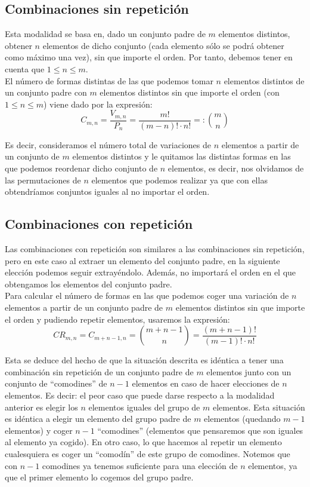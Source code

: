 \subsection{Combinaciones sin repetición}
Esta modalidad se basa en, dado un conjunto padre de $m$ elementos distintos, obtener $n$ elementos
de dicho conjunto (cada elemento sólo se podrá obtener como máximo una vez), sin que importe el orden.
Por tanto, debemos tener en cuenta que $1 \leq n \leq m$.\\


El número de formas distintas de las que podemos tomar $n$ elementos distintos de un conjunto padre con $m$
elementos distintos sin que importe el orden (con $1 \leq n \leq m$) viene dado por la expresión:
$$C_{m, n} = \dfrac{V_{m, n}}{P_n} = \dfrac{m!}{(m-n)! \cdot n!} =: \binom{m}{n} $$


Es decir, consideramos el número total de variaciones de $n$ elementos a partir de un conjunto de $m$ elementos
distintos y le quitamos las distintas formas en las que podemos reordenar dicho conjunto de $n$ elementos,
es decir, nos olvidamos de las permutaciones de $n$ elementos que podemos realizar ya que con ellas
obtendríamos conjuntos iguales al no importar el orden.

\subsection{Combinaciones con repetición}
Las combinaciones con repetición son similares a las combinaciones sin repetición, pero en este caso al extraer un elemento del conjunto padre, en la siguiente elección podemos seguir extrayéndolo. Además, no importará el orden en el que obtengamos los elementos del conjunto padre.\\

Para calcular el número de formas en las que podemos coger una variación de $n$ elementos a partir de un conjunto padre de $m$ elementos distintos sin que importe el orden y pudiendo repetir elementos, usaremos la expresión:
$$CR_{m,n} = C_{m+n-1, n} = \binom{m+n-1}{n} = \dfrac{(m+n-1)!}{(m-1)! \cdot n!}$$

Esta se deduce del hecho de que la situación descrita es idéntica a tener una combinación sin repetición de un conjunto padre de $m$ elementos junto con un conjunto de ``comodines'' de $n-1$ elementos en caso de hacer elecciones de $n$ elementos. Es decir: el peor caso que puede darse respecto a la modalidad anterior es elegir los $n$ elementos iguales del grupo de $m$ elementos. Esta situación es idéntica a elegir un elemento del grupo padre de $m$ elementos (quedando $m-1$ elementos) y coger $n-1$ ``comodines'' (elementos que pensaremos que son iguales al elemento ya cogido). En otro caso, lo que hacemos al repetir un elemento cualesquiera es coger un ``comodín'' de este grupo de comodines. Notemos que con $n-1$ comodines ya tenemos suficiente para una elección de $n$ elementos, ya que el primer elemento lo cogemos del grupo padre.

